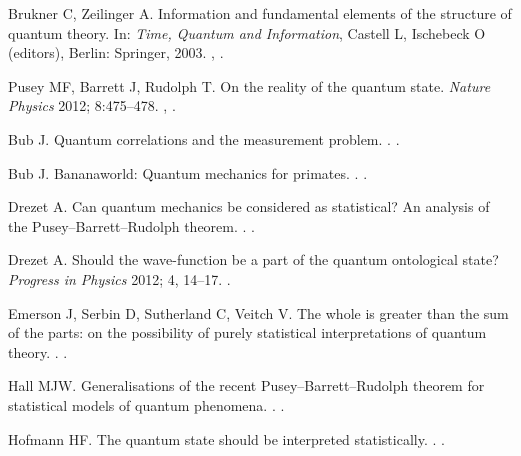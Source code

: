\documentclass[DIV=calc,fontsize=12pt]{scrartcl} %
\theoremstyle{definition}
\theoremstyle{plain}
\begin{document}
\begin{thebibliography}{10}
Brukner C, Zeilinger A.
\newblock Information and fundamental elements of the structure of quantum theory.
\newblock In: \emph{Time, Quantum and Information}, Castell L, Ischebeck O (editors), Berlin: Springer, 2003.
\newblock \href {http://arxiv.org/abs/quant-ph/0212084}{},
\newblock \href {http://dx.doi.org/10.1007/978-3-662-10557-3_21}{}.

Pusey MF, Barrett J, Rudolph T.
\newblock On the reality of the quantum state.
\newblock \emph{Nature Physics} 2012; 8:475--478.
\newblock \href {http://arxiv.org/abs/1111.3328} {},
\href {http://dx.doi.org/10.1038/nphys2309} {}.

Bub J.
\newblock Quantum correlations and the measurement problem.
.
\newblock \href {http://arxiv.org/abs/1210.6371}
{}.

Bub J.
\newblock Bananaworld: Quantum mechanics for primates.
.
\newblock \href {http://arxiv.org/abs/1211.3062} {}.

Drezet A.
\newblock Can quantum mechanics be considered as statistical? An analysis of
the Pusey--Barrett--Rudolph theorem.
.
\newblock \href {http://arxiv.org/abs/1203.2475} {}.

Drezet A.
\newblock Should the wave-function be a part of the quantum ontological state?
\newblock \emph{Progress in Physics} 2012; 4, 14--17.
\newblock \href {http://arxiv.org/abs/1209.2565}{}.

Emerson J, Serbin D, Sutherland C, Veitch V.
\newblock The whole is greater than the sum of the parts: on the possibility of
purely statistical interpretations of quantum theory.
.
\newblock \href {http://arxiv.org/abs/1312.1345} {}.

Hall MJW.
\newblock Generalisations of the recent Pusey--Barrett--Rudolph theorem for
statistical models of quantum phenomena.
.
\newblock \href {http://arxiv.org/abs/1111.6304} {}.

Hofmann HF.
\newblock The quantum state should be interpreted statistically.
.
\newblock \href {http://arxiv.org/abs/1112.2446} {}.


\end{thebibliography}
\end{document}
